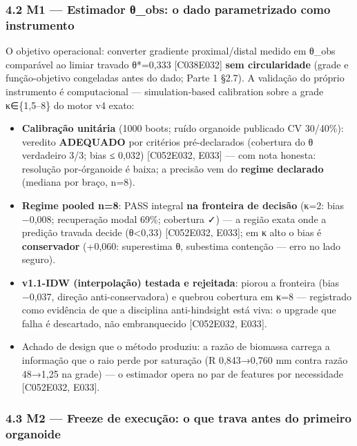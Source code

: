 \documentclass[
  10pt,
]{article}
\providecommand{\tightlist}{%
  \setlength{\itemsep}{0pt}\setlength{\parskip}{0pt}}
\begin{document}
\hypertarget{m1-estimador-ux3b8_obs-o-dado-parametrizado-como-instrumento}{%
\subsubsection{4.2 M1 --- Estimador θ\_obs: o dado parametrizado como
instrumento}\label{m1-estimador-ux3b8_obs-o-dado-parametrizado-como-instrumento}}

O objetivo operacional: converter gradiente proximal/distal medido em
θ\_obs comparável ao limiar travado θ*=0,333 {[}C038\textbar E032{]}
\textbf{sem circularidade} (grade e função-objetivo congeladas antes do
dado; Parte 1 §2.7). A validação do próprio instrumento é computacional
--- simulation-based calibration sobre a grade κ∈\{1,5--8\} do motor v4
exato:

\begin{itemize}
\tightlist
\item
  \textbf{Calibração unitária} (1000 boots; ruído organoide publicado CV
  30/40\%): veredito \textbf{ADEQUADO} por critérios pré-declarados
  (cobertura do θ verdadeiro 3/3; bias ≤ 0,032) {[}C052\textbar E032,
  E033{]} --- com nota honesta: resolução por-órganoide é baixa; a
  precisão vem do \textbf{regime declarado} (mediana por braço, n=8).
\item
  \textbf{Regime pooled n=8}: PASS integral \textbf{na fronteira de
  decisão} (κ=2: bias −0,008; recuperação modal 69\%; cobertura ✓) --- a
  região exata onde a predição travada decide (θ\textless0,33)
  {[}C052\textbar E032, E033{]}; em κ alto o bias é \textbf{conservador}
  (+0,060: superestima θ, subestima contenção --- erro no lado seguro).
\item
  \textbf{v1.1-IDW (interpolação) testada e rejeitada}: piorou a
  fronteira (bias −0,037, direção anti-conservadora) e quebrou cobertura
  em κ=8 --- registrado como evidência de que a disciplina
  anti-hindsight está viva: o upgrade que falha é descartado, não
  embranquecido {[}C052\textbar E032, E033{]}.
\item
  Achado de design que o método produziu: a razão de biomassa carrega a
  informação que o raio perde por saturação (R 0,843→0,760 mm contra
  razão 48→1,25 na grade) --- o estimador opera no par de features por
  necessidade {[}C052\textbar E032, E033{]}.
\end{itemize}

\hypertarget{m2-freeze-de-execuuxe7uxe3o-o-que-trava-antes-do-primeiro-organoide}{%
\subsubsection{4.3 M2 --- Freeze de execução: o que trava antes do
primeiro
organoide}\label{m2-freeze-de-execuuxe7uxe3o-o-que-trava-antes-do-primeiro-organoide}}
\end{document}
